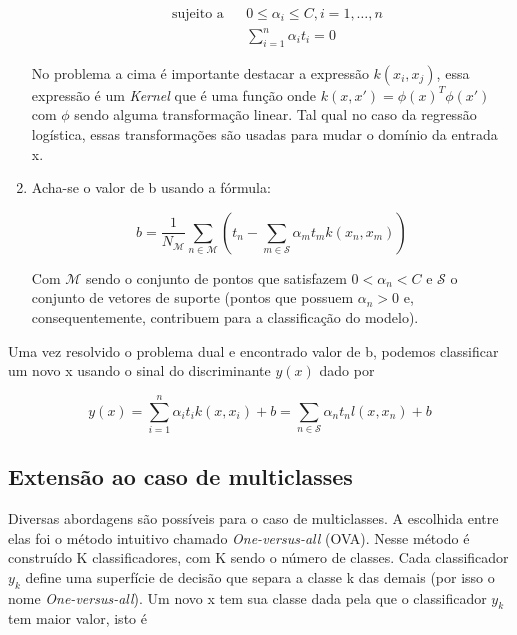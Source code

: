 \begin{enumerate}
\begin{center}
\begin{equation}
\begin{aligned}
				& \text{sujeito a}
				& & 0 \le \alpha_i \le C, i = 1, \ldots, n \\
				&&& \sum_{i = 1}^n \alpha_i t_i = 0 
				\end{aligned}
			\end{equation}
		\end{center}
	No problema a cima é importante destacar a expressão $k(x_i, x_j)$, essa expressão é um
	\textit{Kernel} que é uma função onde $k(x, x') = \phi(x)^T\phi(x')$ com $\phi$ sendo
	alguma transformação linear. Tal qual no caso da regressão logística, essas
	transformações são usadas para mudar o domínio da entrada x.
	\item Acha-se o valor de b usando a fórmula:
		\begin{center}
			\begin{equation}
				b = \frac{1}{N_{\mathcal{M}}} \sum_{n \in \mathcal{M}} \left( t_n - \sum_{m \in \mathcal{S}} \alpha_m t_m k(x_n, x_m) \right)
			\end{equation}
		\end{center}
	Com $\mathcal{M}$ sendo o conjunto de pontos que satisfazem $0 < \alpha_n < C$ e 
	$\mathcal{S}$ o conjunto de vetores de suporte (pontos que possuem $\alpha_n > 0$ e,
	consequentemente, contribuem para a classificação do modelo).
\end{enumerate}

Uma vez resolvido o problema dual e encontrado valor de b, podemos classificar um novo
x usando o sinal do discriminante $y(x)$ dado por
\begin{center}
	\begin{equation}
		y(x) = \sum_{i = 1}^n \alpha_i t_i k(x, x_i) + b = \sum_{n \in \mathcal{S}} \alpha_n t_n l(x, x_n) + b
	\end{equation}
\end{center}

\subsection{Extensão ao caso de multiclasses}

Diversas abordagens são possíveis para o caso de multiclasses. A escolhida entre elas
foi o método intuitivo chamado \textit{One-versus-all} (OVA). Nesse método é construído
K classificadores, com K sendo o número de classes. Cada classificador $y_k$ define uma
superfície de decisão que separa a classe k das demais (por isso o nome \textit{One-versus-all}).
Um novo x tem sua classe dada pela que o classificador $y_k$ tem maior valor, isto é


